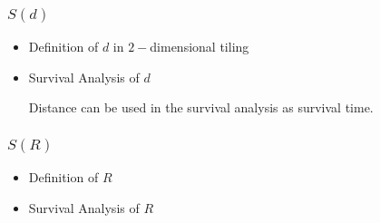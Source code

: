    \subsubsection{$S(d)$}
     \begin{itemize}
       \item Definition of $d$ in $2-$dimensional tiling
       \item Survival Analysis of $d$ \cite{kleinbaum2010survival}
         \par
         Distance can be used in the survival analysis as survival time.\cite{anastasopoulos2017transport} \cite{anastasopoulos2012hazard}
     \end{itemize}    

   \subsubsection{$S(R)$}       
     \begin{itemize}
       \item Definition of $R$
       \item Survival Analysis of $R$
     \end{itemize}
